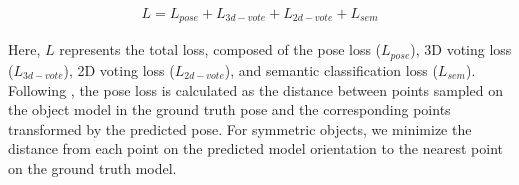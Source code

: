 \begin{align}
L = L_{pose} + L_{3d-vote} + L_{2d-vote} + L_{sem}
\label{eq:loss}
\end{align}

\noindent Here, \(L\) represents the total loss, composed of the pose loss (\(L_{pose}\)), 3D voting loss (\(L_{3d-vote}\)), 2D voting loss (\(L_{2d-vote}\)), and semantic classification loss (\(L_{sem}\)). Following \cite{wang2019densefusion}, the pose loss is calculated as the distance between points sampled on the object model in the ground truth pose and the corresponding points transformed by the predicted pose. For symmetric objects, we minimize the distance from each point on the predicted model orientation to the nearest point on the ground truth model.